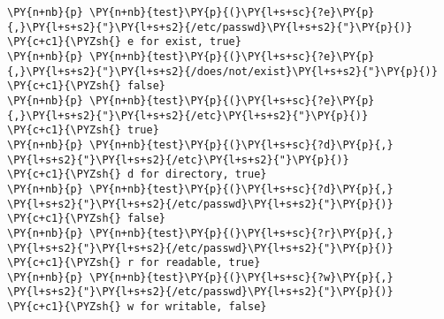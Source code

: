\begin{Verbatim}[commandchars=\\\{\}]
\PY{n+nb}{p} \PY{n+nb}{test}\PY{p}{(}\PY{l+s+sc}{?e}\PY{p}{,}\PY{l+s+s2}{"}\PY{l+s+s2}{/etc/passwd}\PY{l+s+s2}{"}\PY{p}{)}     \PY{c+c1}{\PYZsh{} e for exist, true}
\PY{n+nb}{p} \PY{n+nb}{test}\PY{p}{(}\PY{l+s+sc}{?e}\PY{p}{,}\PY{l+s+s2}{"}\PY{l+s+s2}{/does/not/exist}\PY{l+s+s2}{"}\PY{p}{)} \PY{c+c1}{\PYZsh{} false}
\PY{n+nb}{p} \PY{n+nb}{test}\PY{p}{(}\PY{l+s+sc}{?e}\PY{p}{,}\PY{l+s+s2}{"}\PY{l+s+s2}{/etc}\PY{l+s+s2}{"}\PY{p}{)}            \PY{c+c1}{\PYZsh{} true}
\PY{n+nb}{p} \PY{n+nb}{test}\PY{p}{(}\PY{l+s+sc}{?d}\PY{p}{,} \PY{l+s+s2}{"}\PY{l+s+s2}{/etc}\PY{l+s+s2}{"}\PY{p}{)}           \PY{c+c1}{\PYZsh{} d for directory, true}
\PY{n+nb}{p} \PY{n+nb}{test}\PY{p}{(}\PY{l+s+sc}{?d}\PY{p}{,} \PY{l+s+s2}{"}\PY{l+s+s2}{/etc/passwd}\PY{l+s+s2}{"}\PY{p}{)}    \PY{c+c1}{\PYZsh{} false}
\PY{n+nb}{p} \PY{n+nb}{test}\PY{p}{(}\PY{l+s+sc}{?r}\PY{p}{,} \PY{l+s+s2}{"}\PY{l+s+s2}{/etc/passwd}\PY{l+s+s2}{"}\PY{p}{)}    \PY{c+c1}{\PYZsh{} r for readable, true}
\PY{n+nb}{p} \PY{n+nb}{test}\PY{p}{(}\PY{l+s+sc}{?w}\PY{p}{,} \PY{l+s+s2}{"}\PY{l+s+s2}{/etc/passwd}\PY{l+s+s2}{"}\PY{p}{)}    \PY{c+c1}{\PYZsh{} w for writable, false}
\end{Verbatim}
